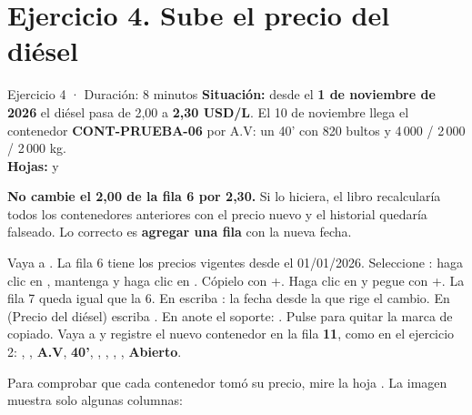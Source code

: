 \section{Ejercicio 4. Sube el precio del diésel}\label{sec:ej4}

\begin{ficha}{Ejercicio 4 · Duración: 8 minutos}
\textbf{Situación:} desde el \textbf{1 de noviembre de 2026} el diésel pasa de 2,00 a \textbf{2,30 USD/L}. El 10 de noviembre llega el
contenedor \textbf{CONT-PRUEBA-06} por A.V: un 40' con 820 bultos y 4\,000 / 2\,000 / 2\,000 kg.\\
\textbf{Hojas:}  y 
\end{ficha}

\begin{atencion}
\textbf{No cambie el 2,00 de la fila 6 por 2,30.} Si lo hiciera, el libro recalcularía todos los contenedores anteriores con el precio nuevo
y el historial quedaría falseado. Lo correcto es \textbf{agregar una fila} con la nueva fecha.
\end{atencion}

\begin{pasos}
\paso Vaya a . La fila 6 tiene los precios vigentes desde el 01/01/2026.
\paso Seleccione : haga clic en , mantenga  y haga clic en . Cópielo con +.
\paso Haga clic en  y pegue con +. La fila 7 queda igual que la 6.
\paso En  escriba : la fecha desde la que rige el cambio.
\paso En  (Precio del diésel) escriba .
\paso En  anote el soporte: .
\paso Pulse  para quitar la marca de copiado.
\paso Vaya a  y registre el nuevo contenedor en la fila \textbf{11}, como en el ejercicio 2:
       ,  ,  \textbf{A.V},  \textbf{40'},
       ,  ,  ,  ,  \textbf{Abierto}.
\end{pasos}


Para comprobar que cada contenedor tomó su precio, mire la hoja . La imagen muestra solo algunas columnas:

